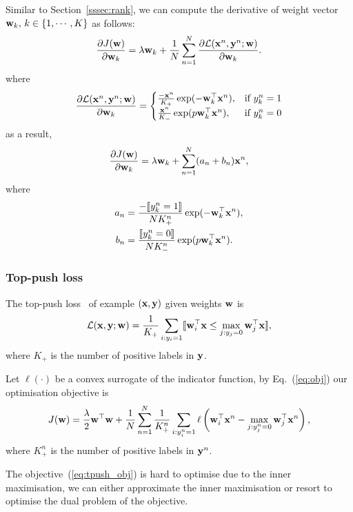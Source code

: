 Similar to Section~\ref{sssec:rank}, we can compute the derivative of weight vector $\mathbf{w}_k, \, k \in \{1,\cdots,K\}$ as follows:
$$
\frac{\partial J(\mathbf{w})} {\partial \mathbf{w}_k} = \lambda \mathbf{w}_k + \frac{1}{N} \sum_{n=1}^N \frac{\partial \mathcal{L}(\mathbf{x}^n, \mathbf{y}^n; \mathbf{w})} {\partial \mathbf{w}_k}.
$$
where
\begin{equation}
\frac{\partial \mathcal{L}(\mathbf{x}^n, \mathbf{y}^n; \mathbf{w})} {\partial \mathbf{w}_k} =
\begin{cases}
\frac{-\mathbf{x}^n}{K_+} \exp(-\mathbf{w}_k^\top \mathbf{x}^n),  & \text{if} \ y_k^n=1 \\
\frac{ \mathbf{x}^n}{K_-} \exp(p\mathbf{w}_k^\top \mathbf{x}^n),  & \text{if} \ y_k^n=0
\end{cases}
\end{equation}
as a result,
\begin{equation}
\label{eq:grad_pclass}
\frac{\partial J(\mathbf{w})} {\partial \mathbf{w}_k} = \lambda \mathbf{w}_k + \sum_{n=1}^N (a_n + b_n) \mathbf{x}^n,
\end{equation}
where
\begin{align*}
a_n &= \frac{-\llbracket y_k^n=1 \rrbracket} {N K_+^n} \exp( -\mathbf{w}_k^\top \mathbf{x}^n), \\
b_n &= \frac{ \llbracket y_k^n=0 \rrbracket} {N K_-^n} \exp(p \mathbf{w}_k^\top \mathbf{x}^n).
\end{align*}



\subsubsection{Top-push loss}
\label{sssec:tpush}

The top-push loss~\cite{li2014top} of example $(\mathbf{x}, \mathbf{y})$ given weights $\mathbf{w}$ is
\begin{equation}
\label{eq:tpush_loss}
\mathcal{L}(\mathbf{x}, \mathbf{y}; \mathbf{w}) = \frac{1}{K_+} \sum_{i:y_i=1} \llbracket \mathbf{w}_i^\top \mathbf{x} \le \underset{j:y_j=0}{\max} \, \mathbf{w}_j^\top \mathbf{x} \rrbracket,
\end{equation}
where $K_+$ is the number of positive labels in $\mathbf{y}$.

Let $\ell(\cdot)$ be a convex surrogate of the indicator function, by Eq.~(\ref{eq:obj}) our optimisation objective is
\begin{equation}
\label{eq:tpush_obj}
J(\mathbf{w}) = \frac{\lambda}{2} \mathbf{w}^\top \mathbf{w} + \frac{1}{N} \sum_{n=1}^N 
        \frac{1}{K_+^n} \sum_{i:y_i^n=1} \ell \left( \mathbf{w}_i^\top \mathbf{x}^n - \underset{j:y_j^n=0}{\max} \, \mathbf{w}_j^\top \mathbf{x}^n \right),
\end{equation}
where $K_+^n$ is the number of positive labels in $\mathbf{y}^n$.

The objective~(\ref{eq:tpush_obj}) is hard to optimise due to the inner maximisation,
we can either approximate the inner maximisation or resort to optimise the dual problem of the objective.
